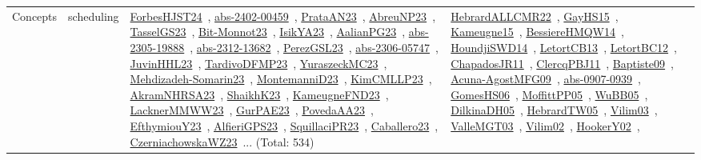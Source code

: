 {\begin{longtable}{lp{3cm}>{\raggedright\arraybackslash}p{6cm}>{\raggedright\arraybackslash}p{6cm}>{\raggedright\arraybackslash}p{8cm}}
Concepts & scheduling & \href{works/ForbesHJST24.pdf}{ForbesHJST24}~\cite{ForbesHJST24}, \href{works/abs-2402-00459.pdf}{abs-2402-00459}~\cite{abs-2402-00459}, \href{works/PrataAN23.pdf}{PrataAN23}~\cite{PrataAN23}, \href{works/AbreuNP23.pdf}{AbreuNP23}~\cite{AbreuNP23}, \href{works/TasselGS23.pdf}{TasselGS23}~\cite{TasselGS23}, \href{works/Bit-Monnot23.pdf}{Bit-Monnot23}~\cite{Bit-Monnot23}, \href{works/IsikYA23.pdf}{IsikYA23}~\cite{IsikYA23}, \href{works/AalianPG23.pdf}{AalianPG23}~\cite{AalianPG23}, \href{works/abs-2305-19888.pdf}{abs-2305-19888}~\cite{abs-2305-19888}, \href{works/abs-2312-13682.pdf}{abs-2312-13682}~\cite{abs-2312-13682}, \href{works/PerezGSL23.pdf}{PerezGSL23}~\cite{PerezGSL23}, \href{works/abs-2306-05747.pdf}{abs-2306-05747}~\cite{abs-2306-05747}, \href{works/JuvinHHL23.pdf}{JuvinHHL23}~\cite{JuvinHHL23}, \href{works/TardivoDFMP23.pdf}{TardivoDFMP23}~\cite{TardivoDFMP23}, \href{works/YuraszeckMC23.pdf}{YuraszeckMC23}~\cite{YuraszeckMC23}, \href{works/Mehdizadeh-Somarin23.pdf}{Mehdizadeh-Somarin23}~\cite{Mehdizadeh-Somarin23}, \href{works/MontemanniD23.pdf}{MontemanniD23}~\cite{MontemanniD23}, \href{works/KimCMLLP23.pdf}{KimCMLLP23}~\cite{KimCMLLP23}, \href{works/AkramNHRSA23.pdf}{AkramNHRSA23}~\cite{AkramNHRSA23}, \href{works/ShaikhK23.pdf}{ShaikhK23}~\cite{ShaikhK23}, \href{works/KameugneFND23.pdf}{KameugneFND23}~\cite{KameugneFND23}, \href{works/LacknerMMWW23.pdf}{LacknerMMWW23}~\cite{LacknerMMWW23}, \href{works/GurPAE23.pdf}{GurPAE23}~\cite{GurPAE23}, \href{works/PovedaAA23.pdf}{PovedaAA23}~\cite{PovedaAA23}, \href{works/EfthymiouY23.pdf}{EfthymiouY23}~\cite{EfthymiouY23}, \href{works/AlfieriGPS23.pdf}{AlfieriGPS23}~\cite{AlfieriGPS23}, \href{works/SquillaciPR23.pdf}{SquillaciPR23}~\cite{SquillaciPR23}, \href{works/Caballero23.pdf}{Caballero23}~\cite{Caballero23}, \href{works/CzerniachowskaWZ23.pdf}{CzerniachowskaWZ23}~\cite{CzerniachowskaWZ23}... (Total: 534) & \href{works/HebrardALLCMR22.pdf}{HebrardALLCMR22}~\cite{HebrardALLCMR22}, \href{works/GayHS15.pdf}{GayHS15}~\cite{GayHS15}, \href{works/Kameugne15.pdf}{Kameugne15}~\cite{Kameugne15}, \href{works/BessiereHMQW14.pdf}{BessiereHMQW14}~\cite{BessiereHMQW14}, \href{works/HoundjiSWD14.pdf}{HoundjiSWD14}~\cite{HoundjiSWD14}, \href{works/LetortCB13.pdf}{LetortCB13}~\cite{LetortCB13}, \href{works/LetortBC12.pdf}{LetortBC12}~\cite{LetortBC12}, \href{works/ChapadosJR11.pdf}{ChapadosJR11}~\cite{ChapadosJR11}, \href{works/ClercqPBJ11.pdf}{ClercqPBJ11}~\cite{ClercqPBJ11}, \href{works/Baptiste09.pdf}{Baptiste09}~\cite{Baptiste09}, \href{works/Acuna-AgostMFG09.pdf}{Acuna-AgostMFG09}~\cite{Acuna-AgostMFG09}, \href{works/abs-0907-0939.pdf}{abs-0907-0939}~\cite{abs-0907-0939}, \href{works/GomesHS06.pdf}{GomesHS06}~\cite{GomesHS06}, \href{works/MoffittPP05.pdf}{MoffittPP05}~\cite{MoffittPP05}, \href{works/WuBB05.pdf}{WuBB05}~\cite{WuBB05}, \href{works/DilkinaDH05.pdf}{DilkinaDH05}~\cite{DilkinaDH05}, \href{works/HebrardTW05.pdf}{HebrardTW05}~\cite{HebrardTW05}, \href{works/Vilim03.pdf}{Vilim03}~\cite{Vilim03}, \href{works/ValleMGT03.pdf}{ValleMGT03}~\cite{ValleMGT03}, \href{works/Vilim02.pdf}{Vilim02}~\cite{Vilim02}, \href{works/HookerY02.pdf}{HookerY02}~\cite{HookerY02}, 
\end{longtable}}
